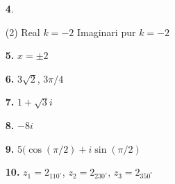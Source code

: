 \documentclass[a4paper, pdf, twoside]{book}
\begin{document}
\begin{multicols}{2}
\begin{enumerate}
 \item[\fontfamily{phv}\selectfont\color{blue}\textbf{4}. ]  \scalebox{0.6}{\simbolclau } 
 \begin{tasks}[column-sep=1em, item-indent=1.3333em](2)
	 \task Real $k=-2$
	 \task Imaginari pur $k=-2$
\end{tasks}
\vspace{0.25cm}
\item[\fontfamily{phv}\selectfont\color{blue}\textbf{5. }]  \scalebox{0.6}{\simbolclau } 
$x=\pm 2$
\vspace{0.25cm}
\item[\fontfamily{phv}\selectfont\color{blue}\textbf{6. }]  \scalebox{0.6}{\simbolclau } 
$3\sqrt {2}$, $3\pi /4$
\vspace{0.25cm}
\item[\fontfamily{phv}\selectfont\color{blue}\textbf{7. }]  \scalebox{0.6}{\simbolclau } 
$1+\sqrt {3}i$
\vspace{0.25cm}
\item[\fontfamily{phv}\selectfont\color{blue}\textbf{8. }]  \scalebox{0.6}{\simbolclau } 
$-8i$
\vspace{0.25cm}
\item[\fontfamily{phv}\selectfont\color{blue}\textbf{9. }]  \scalebox{0.6}{\simbolclau } 
$5(\cos (\pi /2) +i \sin (\pi /2)$
\vspace{0.25cm}
\item[\fontfamily{phv}\selectfont\color{blue}\textbf{10. }]  \scalebox{0.6}{\simbolclau } 
$z_1=2_{110^\circ }$, $z_2=2_{230^\circ }$, $z_3=2_{350^\circ }$
 \end{enumerate}
\vfill\null
\columnbreak
\def\currentname{Solucions del Bloc I}
\vspace*{0.75cm}

 

\vspace*{0.4cm}
 {}
\vspace{0.3cm}



\end{multicols}
\end{document}
